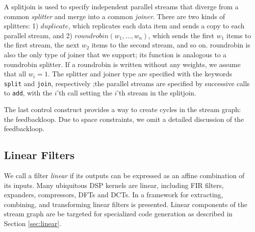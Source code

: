 A splitjoin is used to specify independent parallel streams that
diverge from a common {\it splitter} and merge into a common {\it
joiner}.  There are two kinds of splitters: 1) $duplicate$, which
replicates each data item and sends a copy to each parallel stream,
and 2) $roundrobin(w_1, \dots, w_n)$, which sends the first $w_1$
items to the first stream, the next $w_2$ items to the second stream,
and so on.  roundrobin is also the only type of joiner that we
support; its function is analogous to a roundrobin splitter.  If a
roundrobin is written without any weights, we assume that all $w_i =
1$.  The splitter and joiner type are specified with the keywords {\tt
split} and {\tt join}, respectively 
;the parallel streams are specified by successive calls to {\tt add},
with the $i$'th call setting the $i$'th stream in the splitjoin.

The last control construct provides a way to create cycles in the
stream graph: the feedbackloop.  Due to space constraints, we omit a
detailed discussion of the feedbackloop.

\subsection{Linear Filters}
We call a filter {\it linear} if its outputs can be expressed as an
affine combination of its inputs.  Many ubiquitous DSP kernels are
linear, including FIR filters, expanders, compressors, DFTs and DCTs.
In \cite{streamit-linear} a framework for extracting, combining, and
transforming linear filters is presented.  Linear components of the
stream graph are be targeted for specialized code generation as
described in Section \ref{sec:linear}.

